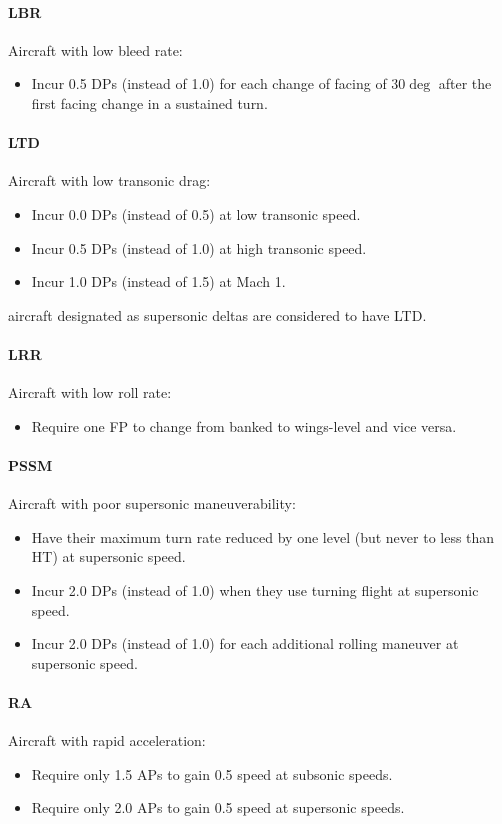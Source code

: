 \documentclass[10pt]{article}
\begin{document}
\paragraph{LBR} Aircraft with low bleed rate:
\begin{itemize}
    \item Incur 0.5 DPs (instead of 1.0) for each change of facing of $30\deg$ after the first facing change in a sustained turn.
\end{itemize}

\paragraph{LTD} Aircraft with low transonic drag:
\begin{itemize}
    \item Incur 0.0 DPs (instead of 0.5) at low transonic speed.
    \item Incur 0.5 DPs (instead of 1.0) at high transonic speed.
    \item Incur 1.0 DPs (instead of 1.5) at Mach 1.
\end{itemize}
{\AirSup} aircraft designated as supersonic deltas are considered to have LTD.

\paragraph{LRR} Aircraft with low roll rate:
\begin{itemize}
    \item Require one FP to change from banked to wings-level and vice versa.
\end{itemize}

\paragraph{PSSM} Aircraft with poor supersonic maneuverability:
\begin{itemize}
    \item Have their maximum turn rate reduced by one level (but never to less than HT) at supersonic speed.
    \item Incur 2.0 DPs (instead of 1.0) when they use turning flight at supersonic speed.
    \item Incur 2.0 DPs (instead of 1.0) for each additional rolling maneuver at supersonic speed.
\end{itemize}

\paragraph{RA} Aircraft with rapid acceleration:
\begin{itemize}
    \item Require only 1.5 APs to gain 0.5 speed at subsonic speeds.
    \item Require only 2.0 APs to gain 0.5 speed at supersonic speeds.
\end{itemize}
\end{document}
